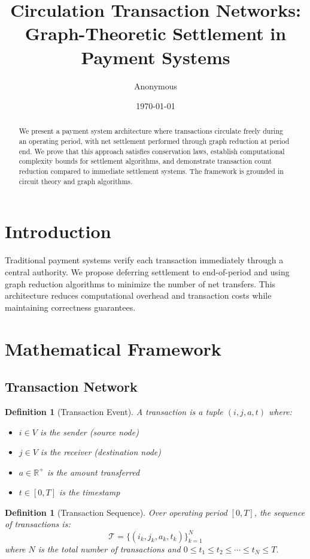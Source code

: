\documentclass[12pt]{article}
\title{Circulation Transaction Networks: \\
Graph-Theoretic Settlement in Payment Systems}
\author{Anonymous}
\date{\today}
\newtheorem{definition}[theorem]{Definition}
\begin{document}
\maketitle

\begin{abstract}
We present a payment system architecture where transactions circulate freely during an operating period, with net settlement performed through graph reduction at period end. We prove that this approach satisfies conservation laws, establish computational complexity bounds for settlement algorithms, and demonstrate transaction count reduction compared to immediate settlement systems. The framework is grounded in circuit theory and graph algorithms.
\end{abstract}

\section{Introduction}

Traditional payment systems verify each transaction immediately through a central authority. We propose deferring settlement to end-of-period and using graph reduction algorithms to minimize the number of net transfers. This architecture reduces computational overhead and transaction costs while maintaining correctness guarantees.

\section{Mathematical Framework}

\subsection{Transaction Network}

\begin{definition}[Transaction Event]
A transaction is a tuple $(i, j, a, t)$ where:
\begin{itemize}
    \item $i \in V$ is the sender (source node)
    \item $j \in V$ is the receiver (destination node)
    \item $a \in \mathbb{R}^+$ is the amount transferred
    \item $t \in [0, T]$ is the timestamp
\end{itemize}
\end{definition}

\begin{definition}[Transaction Sequence]
Over operating period $[0, T]$, the sequence of transactions is:
$$
\mathcal{T} = \{(i_k, j_k, a_k, t_k)\}_{k=1}^{N}
$$
where $N$ is the total number of transactions and $0 \leq t_1 \leq t_2 \leq \cdots \leq t_N \leq T$.
\end{definition}
\end{document}

